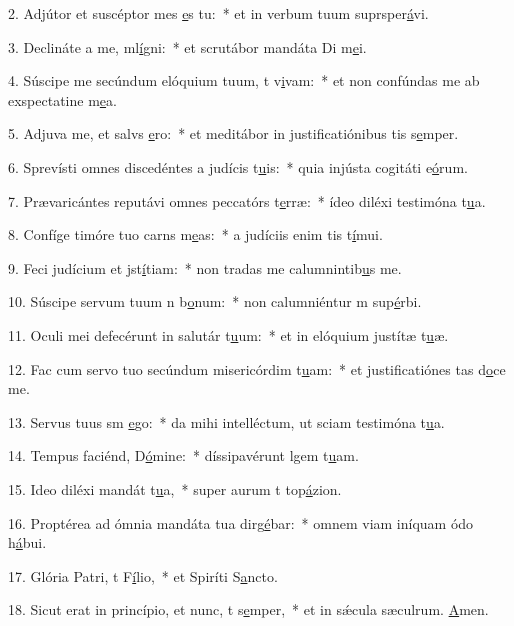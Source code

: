 2. Adjútor et suscéptor mes \uline{e}s tu:~* et in verbum tuum suprsper\uline{á}vi.\par 
3. Declináte a me, ml\uline{í}gni:~* et scrutábor mandáta Di m\uline{e}i.\par 
4. Súscipe me secúndum elóquium tuum, t v\uline{i}vam:~* et non confúndas me ab exspectatine m\uline{e}a.\par 
5. Adjuva me, et salvs \uline{e}ro:~* et meditábor in justificatiónibus tis s\uline{e}mper.\par 
6. Sprevísti omnes discedéntes a judícis t\uline{u}is:~* quia injústa cogitáti e\uline{ó}rum.\par 
7. Prævaricántes reputávi omnes peccatórs t\uline{e}rræ:~* ídeo diléxi testimóna t\uline{u}a.\par 
8. Confíge timóre tuo carns m\uline{e}as:~* a judíciis enim tis t\uline{í}mui.\par 
9. Feci judícium et jst\uline{í}tiam:~* non tradas me calumnintib\uline{u}s me.\par 
10. Súscipe servum tuum n b\uline{o}num:~* non calumniéntur m sup\uline{é}rbi.\par 
11. Oculi mei defecérunt in salutár t\uline{u}um:~* et in elóquium justítæ t\uline{u}æ.\par 
12. Fac cum servo tuo secúndum misericórdim t\uline{u}am:~* et justificatiónes tas d\uline{o}ce me.\par 
13. Servus tuus sm \uline{e}go:~* da mihi intelléctum, ut sciam testimóna t\uline{u}a.\par 
14. Tempus faciénd, D\uline{ó}mine:~* díssipavérunt lgem t\uline{u}am.\par 
15. Ideo diléxi mandát t\uline{u}a,~* super aurum t top\uline{á}zion.\par 
16. Proptérea ad ómnia mandáta tua dirg\uline{é}bar:~* omnem viam iníquam ódo h\uline{á}bui.\par 
17. Glória Patri, t F\uline{í}lio,~* et Spiríti S\uline{a}ncto.\par 
18. Sicut erat in princípio, et nunc, t s\uline{e}mper,~* et in sǽcula sæculrum. \uline{A}men.\par 
